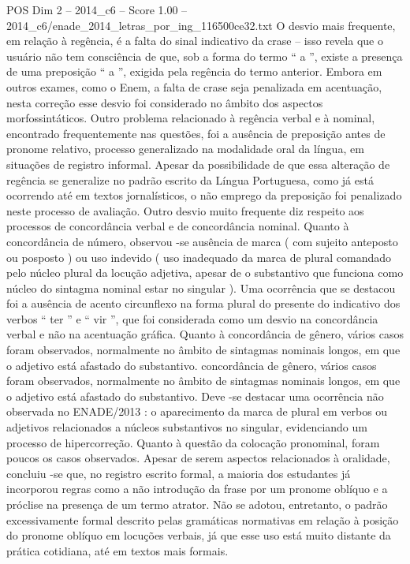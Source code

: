 \begin{textsample}{POS Dim 2 – 2014\_c6 – Score 1.00 – 2014\_c6/enade\_2014\_letras\_por\_ing\_116500ce32.txt}
O desvio mais frequente, em relação à regência, é a falta do sinal indicativo da crase – isso revela que o usuário não tem consciência de que, sob a forma do termo “ a ”, existe a presença de uma preposição “ a ”, exigida pela regência do termo anterior.
Embora em outros exames, como o Enem, a falta de crase seja penalizada em acentuação, nesta correção esse desvio foi considerado no âmbito dos aspectos morfossintáticos.
Outro problema relacionado à regência verbal e à nominal, encontrado frequentemente nas questões, foi a ausência de preposição antes de pronome relativo, processo generalizado na modalidade oral da língua, em situações de registro informal.
Apesar da possibilidade de que essa alteração de regência se generalize no padrão escrito da Língua Portuguesa, como já está ocorrendo até em textos jornalísticos, o não emprego da preposição foi penalizado neste processo de avaliação.
Outro desvio muito frequente diz respeito aos processos de concordância verbal e de concordância nominal.
Quanto à concordância de número, observou -se ausência de marca ( com sujeito anteposto ou posposto ) ou uso indevido ( uso inadequado da marca de plural comandado pelo núcleo plural da locução adjetiva, apesar de o substantivo que funciona como núcleo do sintagma nominal estar no singular ).
Uma ocorrência que se destacou foi a ausência de acento circunflexo na forma plural do presente do indicativo dos verbos “ ter ” e “ vir ”, que foi considerada como um desvio na concordância verbal e não na acentuação gráfica.
Quanto à concordância de gênero, vários casos foram observados, normalmente no âmbito de sintagmas nominais longos, em que o adjetivo está afastado do substantivo. concordância de gênero, vários casos foram observados, normalmente no âmbito de sintagmas nominais longos, em que o adjetivo está afastado do substantivo.
Deve -se destacar uma ocorrência não observada no ENADE/2013 : o aparecimento da marca de plural em verbos ou adjetivos relacionados a núcleos substantivos no singular, evidenciando um processo de hipercorreção.
Quanto à questão da colocação pronominal, foram poucos os casos observados.
Apesar de serem aspectos relacionados à oralidade, concluiu -se que, no registro escrito formal, a maioria dos estudantes já incorporou regras como a não introdução da frase por um pronome oblíquo e a próclise na presença de um termo atrator.
Não se adotou, entretanto, o padrão excessivamente formal descrito pelas gramáticas normativas em relação à posição do pronome oblíquo em locuções verbais, já que esse uso está muito distante da prática cotidiana, até em textos mais formais.

\end{textsample}
